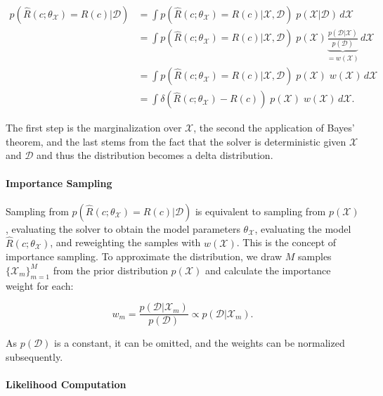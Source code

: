 \begin{align*}
p(\hat{R}(c;\theta_{\mathcal{X}}) = R(c)| \mathcal{D}) &= \int p(\hat{R}(c;\theta_{\mathcal{X}}) = R(c) | \mathcal{X}, \mathcal{D})\; p(\mathcal{X} | \mathcal{D}) \, d\mathcal{X} \\
                                          &= \int p(\hat{R}(c;\theta_{\mathcal{X}}) = R(c) | \mathcal{X}, \mathcal{D})\; p(\mathcal{X}) \underbrace{\frac{p(\mathcal{D} | \mathcal{X}) }{p(\mathcal{D})}}_{= w(\mathcal{X})} \, d\mathcal{X} \\
                                          &= \int p(\hat{R}(c;\theta_{\mathcal{X}}) = R(c) | \mathcal{X}, \mathcal{D})\; p(\mathcal{X})\; w(\mathcal{X}) \, d\mathcal{X} \\
                                          &= \int \delta(\hat{R}(c;\theta_{\mathcal{X}}) - R(c))\; p(\mathcal{X})\; w(\mathcal{X}) \, d\mathcal{X} .
\end{align*}

The first step is the marginalization over $\mathcal{X}$, the second the application of Bayes' theorem, and the last stems from the fact that the solver is deterministic given $\mathcal{X}$ and $\mathcal{D}$ and thus the distribution becomes a delta distribution.


\paragraph{Importance Sampling}

Sampling from $p(\hat{R}(c;\theta_{\mathcal{X}}) = R(c)| \mathcal{D})$ is equivalent to sampling from $p(\mathcal{X})$, evaluating the solver to obtain the model parameters $\theta_{\mathcal{X}}$, evaluating the model $\hat{R}(c;\theta_{\mathcal{X}})$, and reweighting the samples with $w(\mathcal{X})$. This is the concept of importance sampling. To approximate the distribution, we draw $M$ samples $\{\mathcal{X}_m\}_{m=1}^M$ from the prior distribution $p(\mathcal{X})$ and calculate the importance weight for each:

\begin{equation*}
w_m = \frac{p(\mathcal{D} | \mathcal{X}_m)}{p(\mathcal{D})} \propto p(\mathcal{D} | \mathcal{X}_m) .
\end{equation*}

As $p(\mathcal{D})$ is a constant, it can be omitted, and the weights can be normalized subsequently.


\paragraph{Likelihood Computation}

